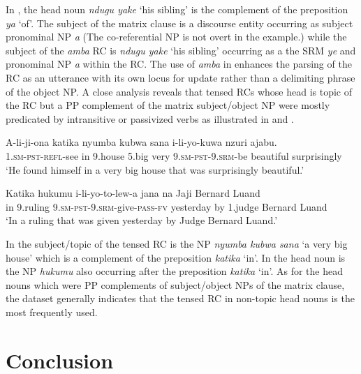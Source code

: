 \documentclass[output=paper,colorlinks,citecolor=brown]{langscibook}
\begin{document}
In , the head noun \textit{ndugu yake} ‘his sibling’ is the complement of the preposition \textit{ya} ‘of’. The subject of the matrix clause is a discourse entity occurring as subject pronominal NP \textit{a} (The co-referential NP is not overt in the example.) while the subject of the \textit{amba} RC is \textit{ndugu yake} ‘his sibling’ occurring as a the SRM \textit{ye} and pronominal NP \textit{a} within the RC. The use of \textit{amba} in  enhances the parsing of the RC as an utterance with its own locus for update rather than a delimiting phrase of the object NP. A close analysis reveals that tensed RCs whose head is topic of the RC but a PP complement of the matrix subject/object NP were mostly predicated by intransitive or passivized verbs as illustrated in  and .

\ea%
    \label{ex:mwamzandi:31}
    \gll    A-li-ji-ona katika nyumba kubwa sana i-li-yo-kuwa nzuri ajabu.\\
            \textsc{1.sm-pst-refl-}see in 9.house 5.big very \textsc{9.sm-pst-9.srm-}be beautiful surprisingly\\
    \glt    ‘He found himself in a very big house that was surprisingly beautiful.’
\z

\ea%
    \label{ex:mwamzandi:32}
    \gll    Katika hukumu i-li-yo-to-lew-a jana na Jaji Bernard Luand\\
            in 9.ruling \textsc{9.sm-pst-9.srm-}give\textsc{-pass-fv} yesterday by 1.judge Bernard Luand\\
    \glt    ‘In a ruling that was given yesterday by Judge Bernard Luand.’
\z

In  the subject/topic of the tensed RC is the NP \textit{nyumba kubwa sana} ‘a very big house’ which is a complement of the preposition \textit{katika} ‘in’. In  the head noun is the NP \textit{hukumu} also occurring after the preposition \textit{katika} ‘in’. As for the head nouns which were PP complements of subject/object NPs of the matrix clause, the dataset generally indicates that the tensed RC in non-topic head nouns is the most frequently used.

\section{Conclusion}\label{sec:mwamzandi:5}
\end{document}
